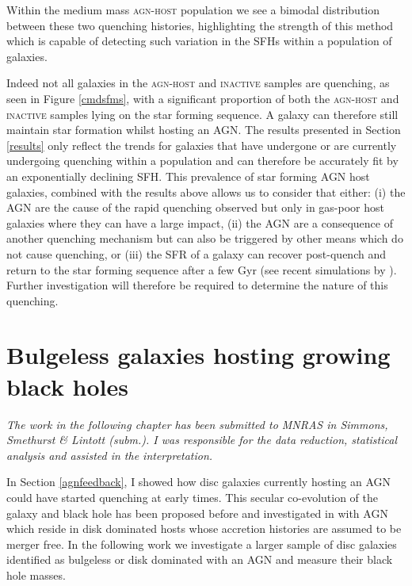 Within the medium mass \textsc{agn-host} population we see a bimodal distribution between these two quenching histories, highlighting the strength of this method which is capable of detecting such variation in the SFHs within a population of galaxies. 

Indeed not all galaxies in the \textsc{agn-host} and \textsc{inactive} samples are quenching, as seen in Figure \ref{cmdsfms}, with a significant proportion of both the \textsc{agn-host} and \textsc{inactive} samples lying on the star forming sequence. A galaxy can therefore still maintain star formation whilst hosting an AGN. The results presented in Section \ref{results} only reflect the trends for galaxies that have undergone or are currently undergoing quenching within a population and can therefore be accurately fit by an exponentially declining SFH. This prevalence of star forming AGN host galaxies, combined with the results above allows us to consider that either: (i)  the AGN are the cause of the rapid quenching observed but only in gas-poor host galaxies where they can have a large impact, (ii) the AGN are a consequence of another quenching mechanism but can also be triggered by other means which do not cause quenching, or (iii) the SFR of a galaxy can recover post-quench and return to the star forming sequence after a few Gyr (see recent simulations by \citealt{pontzen16}). Further investigation will therefore be required to determine the nature of this quenching.


\newpage

\section{Bulgeless galaxies hosting growing black holes}

\emph{The work in the following chapter has been submitted to MNRAS in Simmons, Smethurst \& Lintott (subm.). I was responsible for the data reduction, statistical analysis and assisted in the interpretation.}

In Section \ref{agnfeedback}, I showed how disc galaxies currently hosting an AGN could have started quenching at early times. This secular co-evolution of the galaxy and black hole has been proposed before and investigated in \citet{Simmons13} with AGN which reside in disk dominated hosts whose accretion histories are assumed to be merger free. In the following work we investigate a larger sample of disc galaxies identified as bulgeless or disk dominated with an AGN and measure their black hole masses. 

